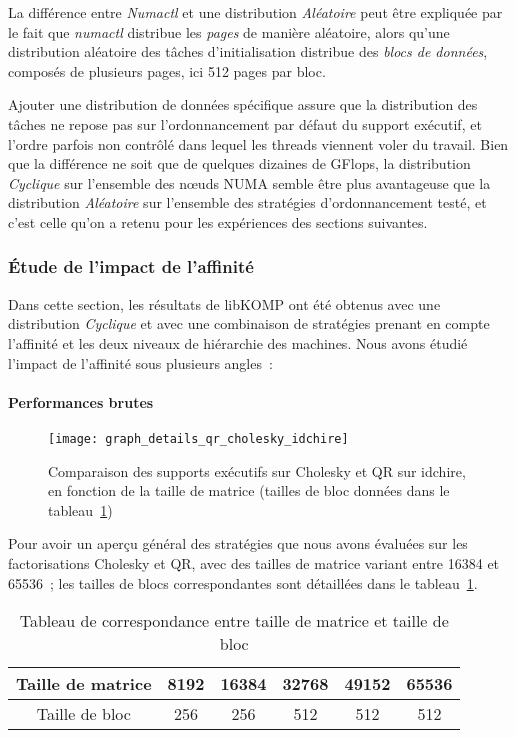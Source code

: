 La différence entre \emph{Numactl} et une distribution \emph{Aléatoire} peut être expliquée par le fait que \emph{numactl} distribue les \emph{pages} de manière aléatoire, alors qu'une distribution aléatoire des tâches d'initialisation distribue des \emph{blocs de données}, composés de plusieurs pages, ici 512 pages par bloc.

Ajouter une distribution de données spécifique assure que la distribution des tâches ne repose pas sur l'ordonnancement par défaut du support exécutif, et l'ordre parfois non contrôlé dans lequel les threads viennent voler du travail.
Bien que la différence ne soit que de quelques dizaines de GFlops, la distribution \emph{Cyclique} sur l'ensemble des nœuds NUMA semble être plus avantageuse que la distribution \emph{Aléatoire} sur l'ensemble des stratégies d'ordonnancement testé, et c'est celle qu'on a retenu pour les expériences des sections suivantes.


\subsubsection{Étude de l'impact de l'affinité}

Dans cette section, les résultats de libKOMP ont été obtenus avec une distribution \emph{Cyclique} et avec une combinaison de stratégies prenant en compte l'affinité et les deux niveaux de hiérarchie des machines.
Nous avons étudié l'impact de l'affinité sous plusieurs angles~:

\paragraph{Performances brutes}

\begin{figure}[h!]
  \centering
  \texttt{[image: graph\_details\_qr\_cholesky\_idchire]}
  \caption{Comparaison des supports exécutifs sur Cholesky et QR sur idchire, en fonction de la taille de matrice (tailles de bloc données dans le tableau~\ref{tab:perf_eval:blocksizes})}\label{fig:contribs:perf_eval:eval-qr-cholesky}
\end{figure}

Pour avoir un aperçu général des stratégies que nous avons évaluées sur les factorisations Cholesky et QR, avec des tailles de matrice variant entre 16384 et 65536~; les tailles de blocs correspondantes sont détaillées dans le tableau~\ref{tab:perf_eval:blocksizes}.

\begin{table}[h!]
\def\arraystretch{1.5}
\centering
\begin{tabular}{|c|c|c|c|c|c|}\hline
  Taille de matrice & 8192 & 16384 & 32768 & 49152 & 65536 \\\hline
  Taille de bloc & 256 & 256 & 512 & 512 & 512 \\\hline
\end{tabular}
\caption{Tableau de correspondance entre taille de matrice et taille de bloc}\label{tab:perf_eval:blocksizes}
\end{table}

